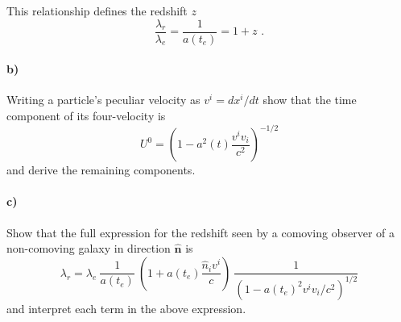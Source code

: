 \documentclass[12pt]{article}
\begin{document}
This relationship defines the redshift $z$
\begin{equation}
    \frac{\lambda_{r}}{\lambda_e} = \frac{1}{a(t_e)} = 1 + z \text{ .}
\end{equation}

\paragraph{b)} Writing a particle's peculiar velocity as $v^i = d x^i / dt$ show that the time component of its four-velocity is
\begin{equation}
    U^0 = \left(1 - a^2(t) \frac{v^i v_i}{c^2}\right)^{-1/2}
\end{equation}
and derive the remaining components.

\paragraph{c)} Show that the full expression for the redshift seen by a comoving observer of a non-comoving galaxy in direction $\hat{\mathbf{n}}$ is
\begin{equation}
    \lambda_r = \lambda_e \: \frac{1}{a(t_e)} \: \left(1 + a(t_e) \frac{\hat{n}_i v^i}{c} \right) \: \frac{1}{\left(1 - a(t_e)^2 v^i v_i / c^2\right)^{1/2}}
\end{equation}
and interpret each term in the above expression.
\end{document}
